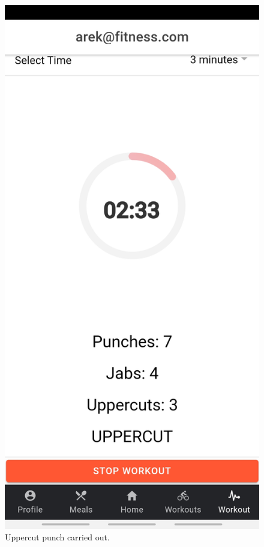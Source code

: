 \documentclass[a4paper,12pt]{report}
\begin{document}
\begin{figure}[ht]
\begin{minipage}[b]{0.5\linewidth}
    \includegraphics[width=.7\linewidth]{images/aplicationImages/uppercutDisplayed.jpeg} 
    \caption{Uppercut punch carried out.} 
    \vspace{4ex}
  \end{minipage} 
  \begin{center}
  \begin{minipage}[b]{0.5\linewidth}
    \centering

\end{minipage}
\end{center}
\end{figure}
\end{document}
